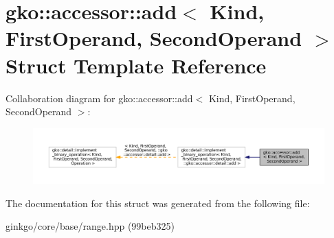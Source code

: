 \hypertarget{structgko_1_1accessor_1_1add}{}\section{gko\+:\+:accessor\+:\+:add$<$ Kind, First\+Operand, Second\+Operand $>$ Struct Template Reference}
\label{structgko_1_1accessor_1_1add}


Collaboration diagram for gko\+:\+:accessor\+:\+:add$<$ Kind, First\+Operand, Second\+Operand $>$\+:
\nopagebreak
\begin{figure}[H]
\begin{center}
\leavevmode
\includegraphics[width=350pt]{structgko_1_1accessor_1_1add__coll__graph}
\end{center}
\end{figure}


The documentation for this struct was generated from the following file\+:\begin{DoxyCompactItemize}
\item 
ginkgo/core/base/range.\+hpp (99beb325)\end{DoxyCompactItemize}
